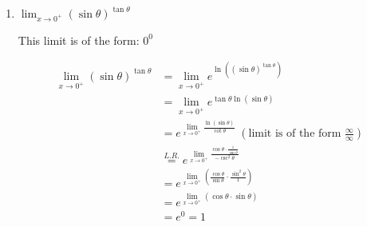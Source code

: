 \documentclass[nooutcomes,handout]{ximera}
\begin{document}
\begin{problem}
\begin{enumerate}
    
    \item $\lim_{x \to 0^+} (\sin\theta)^{\tan\theta}$
        \begin{freeResponse}
    This limit is of the form: $0^0$
    
     \begin{align*}
        \lim_{x \to 0^+} (\sin\theta)^{\tan\theta} &= \lim_{x \to 0^+} e^{\ln \left((\sin\theta)^{\tan\theta} \right) } \\
                                            &= \lim_{x \to 0^+} e^{\tan\theta \ln (\sin\theta) } \\
                                            &= e^{ \lim_{x \to 0^+} \frac{\ln (\sin\theta)}{\cot\theta} } \; \left( \text{limit is of the form } \frac{\infty}{\infty} \right) \\
                                            &\stackrel{L.R.}{=} e^{\lim_{x \to 0^+}\frac{\cos\theta \cdot \frac{1}{\sin\theta}}{-\csc^2\theta}} \\
                                            &= e^{\lim_{x \to 0^+} \left(\frac{\cos\theta}{\sin\theta}\cdot\frac{\sin^2\theta}{1}\right)} \\
                                              &= e^{\lim_{x \to 0^+} (\cos\theta\cdot\sin\theta)} \\
                                            &= e^0=1
        \end{align*}
    \end{freeResponse}
    

    
  \end{enumerate}
\end{problem}
\end{document}
